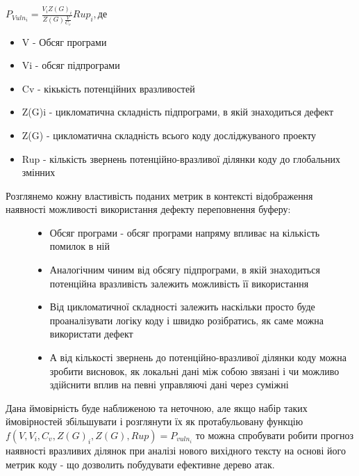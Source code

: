 $P_{Vuln_i} = \frac{V_i Z(G)_i}{Z(G) \frac{V}{C_v}}Rup_i, де$
\begin{itemize}
\item {} 
V - Обсяг програми

\item {} 
Vi - обсяг підпрограми

\item {} 
Cv - кікькість потенційних вразливостей

\item {} 
Z(G)i - цикломатична складність підпрограми, в якій знаходиться дефект

\item {} 
Z(G) - цикломатична складність всього коду досліджуваного проекту

\item {} 
Rup - кількість звернень потенційно-вразливої ділянки коду до глобальних змінних

\end{itemize}
\begin{description}
\item[{Розглянемо кожну властивість поданих метрик в контексті відображення наявності можливості використання дефекту переповнення буферу:}] \leavevmode\begin{itemize}
\item {} 
Обсяг програми - обсяг програми напряму впливає на кількість помилок в ній

\item {} 
Аналогічним чиним від обсягу підпрограми, в якій знаходиться потенційна вразливість залежить можливість її використання

\item {} 
Від цикломатичної складності залежить наскільки просто буде проаналізувати логіку коду і швидко розібратись, як саме можна використати дефект

\item {} 
А від кількості звернень до потенційно-вразливої ділянки коду можна зробити висновок, як локальні дані між собою звязані і чи можливо здійснити вплив на певні управляючі дані через суміжні

\end{itemize}

\end{description}

Дана ймовірність буде наближеною та неточною, але якщо набір таких ймовірностей збільшувати і розглянути їх як протабульовану функцію
$f(V,V_i,C_v,Z(G)_i,Z(G),Rup) = P_{vuln_i}$
то можна спробувати робити прогноз наявності вразливих ділянок при аналізі нового вихідного тексту на основі  його метрик коду - що дозволить побудувати ефективне дерево атак.


